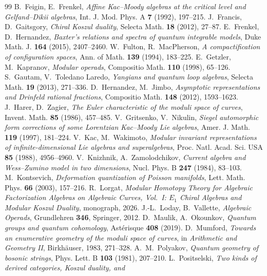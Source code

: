 \documentclass[11pt]{amsart}
\numberwithin{equation}{section}
\theoremstyle{plain}
\theoremstyle{definition}
\theoremstyle{remark}
\begin{document}
\begin{thebibliography}{99}
 B.~Feigin, E.~Frenkel,
\emph{Affine Kac--Moody algebras at the critical level and
Gelfand--Dikii algebras},
Int. J. Mod. Phys. A \textbf{7} (1992), 197--215.
 J.~Francis, D.~Gaitsgory,
\emph{Chiral Koszul duality},
Selecta Math. \textbf{18} (2012), 27--87.
 E.~Frenkel, D.~Hernandez,
\emph{Baxter's relations and spectra of quantum integrable models},
Duke Math. J. \textbf{164} (2015), 2407--2460.
 W.~Fulton, R.~MacPherson,
\emph{A compactification of configuration spaces},
Ann. of Math. \textbf{139} (1994), 183--225.
 E.~Getzler, M.~Kapranov,
\emph{Modular operads},
Compositio Math. \textbf{110} (1998), 65--126.
 S.~Gautam, V.~Toledano Laredo,
\emph{Yangians and quantum loop algebras},
Selecta Math. \textbf{19} (2013), 271--336.
 D.~Hernandez, M.~Jimbo,
\emph{Asymptotic representations and Drinfeld rational fractions},
Compositio Math. \textbf{148} (2012), 1593--1623.
 J.~Harer, D.~Zagier,
\emph{The Euler characteristic of the moduli space of curves},
Invent. Math. \textbf{85} (1986), 457--485.
 V.~Gritsenko, V.~Nikulin,
\emph{Siegel automorphic form corrections of some Lorentzian
Kac--Moody Lie algebras},
Amer. J. Math. \textbf{119} (1997), 181--224.
 V.~Kac, M.~Wakimoto,
\emph{Modular invariant representations of infinite-dimensional Lie
algebras and superalgebras},
Proc. Natl. Acad. Sci. USA \textbf{85} (1988), 4956--4960.
 V.~Knizhnik, A.~Zamolodchikov,
\emph{Current algebra and Wess--Zumino model in two dimensions},
Nucl. Phys. B \textbf{247} (1984), 83--103.
 M.~Kontsevich,
\emph{Deformation quantization of Poisson manifolds},
Lett. Math. Phys. \textbf{66} (2003), 157--216.
 R.~Lorgat,
\emph{Modular Homotopy Theory for Algebraic Factorization Algebras
on Algebraic Curves, Vol.~I: $E_1$ Chiral Algebras and Modular Koszul
Duality}, monograph, 2026.
 J.-L.~Loday, B.~Vallette,
\emph{Algebraic Operads},
Grundlehren \textbf{346}, Springer, 2012.
 D.~Maulik, A.~Okounkov,
\emph{Quantum groups and quantum cohomology},
Ast\'erisque \textbf{408} (2019).
 D.~Mumford,
\emph{Towards an enumerative geometry of the moduli space of curves},
in \emph{Arithmetic and Geometry II}, Birkh\"auser, 1983, 271--328.
 A.~M.~Polyakov,
\emph{Quantum geometry of bosonic strings},
Phys. Lett. B \textbf{103} (1981), 207--210.
 L.~Positselski,
\emph{Two kinds of derived categories, Koszul duality, and
}
\end{thebibliography}
\end{document}
